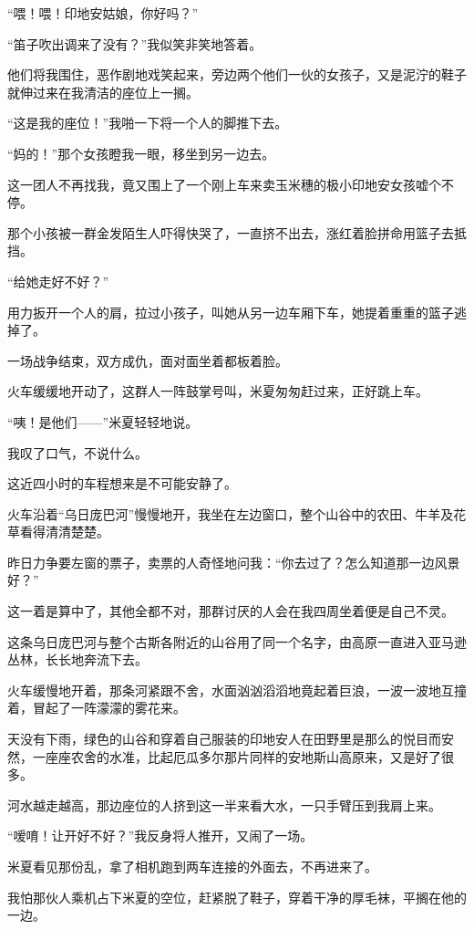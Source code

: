 \par “喂！喂！印地安姑娘，你好吗？”
\par “笛子吹出调来了没有？”我似笑非笑地答着。
\par 他们将我围住，恶作剧地戏笑起来，旁边两个他们一伙的女孩子，又是泥泞的鞋子就伸过来在我清洁的座位上一搁。
\par “这是我的座位！”我啪一下将一个人的脚推下去。
\par “妈的！”那个女孩瞪我一眼，移坐到另一边去。
\par 这一团人不再找我，竟又围上了一个刚上车来卖玉米穗的极小印地安女孩嘘个不停。
\par 那个小孩被一群金发陌生人吓得快哭了，一直挤不出去，涨红着脸拼命用篮子去抵挡。
\par “给她走好不好？”
\par 用力扳开一个人的肩，拉过小孩子，叫她从另一边车厢下车，她提着重重的篮子逃掉了。
\par 一场战争结束，双方成仇，面对面坐着都板着脸。
\par 火车缓缓地开动了，这群人一阵鼓掌号叫，米夏匆匆赶过来，正好跳上车。
\par “咦！是他们——”米夏轻轻地说。
\par 我叹了口气，不说什么。
\par 这近四小时的车程想来是不可能安静了。
\par 火车沿着“乌日庞巴河”慢慢地开，我坐在左边窗口，整个山谷中的农田、牛羊及花草看得清清楚楚。
\par 昨日力争要左窗的票子，卖票的人奇怪地问我：“你去过了？怎么知道那一边风景好？”
\par 这一着是算中了，其他全都不对，那群讨厌的人会在我四周坐着便是自己不灵。
\par 这条乌日庞巴河与整个古斯各附近的山谷用了同一个名字，由高原一直进入亚马逊丛林，长长地奔流下去。
\par 火车缓慢地开着，那条河紧跟不舍，水面汹汹滔滔地竟起着巨浪，一波一波地互撞着，冒起了一阵濛濛的雾花来。
\par 天没有下雨，绿色的山谷和穿着自己服装的印地安人在田野里是那么的悦目而安然，一座座农舍的水准，比起厄瓜多尔那片同样的安地斯山高原来，又是好了很多。
\par 河水越走越高，那边座位的人挤到这一半来看大水，一只手臂压到我肩上来。
\par “嗳唷！让开好不好？”我反身将人推开，又闹了一场。
\par 米夏看见那份乱，拿了相机跑到两车连接的外面去，不再进来了。
\par 我怕那伙人乘机占下米夏的空位，赶紧脱了鞋子，穿着干净的厚毛袜，平搁在他的一边。
